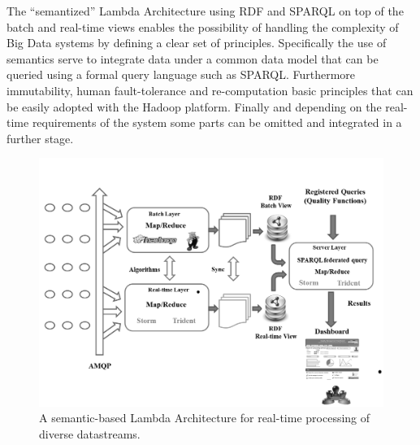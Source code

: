 The ``semantized'' Lambda Architecture using RDF and SPARQL on top of the batch and real-time views enables 
the possibility of handling the complexity of Big Data systems by defining a clear set of principles. Specifically 
the use of semantics serve to integrate data under a common data model that can be queried using a formal 
query language such as SPARQL. Furthermore immutability, human fault-tolerance and re-computation basic principles 
that can be easily adopted with the Hadoop platform. Finally and depending on the real-time requirements of 
the system some parts can be omitted and integrated in a further stage.

\begin{figure}[!ht]
\centering
	\includegraphics[width=12cm]{./imgs/lambda-qos}
 \caption{A semantic-based Lambda Architecture for real-time processing of diverse datastreams.}
 \label{fig:lambda-qos}
\end{figure}






